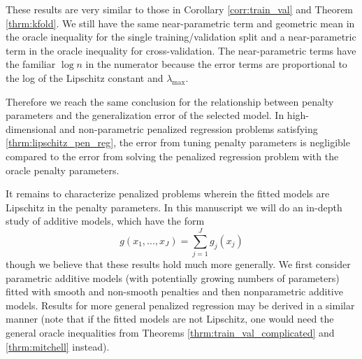 \documentclass[12pt]{article}
\begin{document}
These results are very similar to those in Corollary \ref{corr:train_val} and Theorem \ref{thrm:kfold}. We still have the same near-parametric term and geometric mean in the oracle inequality for the single training/validation split and a near-parametric term in the oracle inequality for cross-validation. The near-parametric terms have the familiar $\log n$ in the numerator because the error terms are proportional to the log of the Lipschitz constant and $\lambda_{\max}$. 

Therefore we reach the same conclusion for the relationship between penalty parameters and the generalization error of the selected model. In high-dimensional and non-parametric penalized regression problems satisfying \eqref{thrm:lipschitz_pen_reg}, the error from tuning penalty parameters is negligible compared to the error from solving the penalized regression problem with the oracle penalty parameters.

It remains to characterize penalized problems wherein the fitted models are Lipschitz in the penalty parameters. In this manuscript we will do an in-depth study of additive models, which have the form
\begin{equation}
g(x_1, ..., x_J)= \sum_{j=1}^J g_j(x_j)
\end{equation}
though we believe that these results hold much more generally. We first consider parametric additive models (with potentially growing numbers of parameters) fitted with smooth and non-smooth penalties and then nonparametric additive models. Results for more general penalized regression may be derived in a similar manner (note that if the fitted models are not Lipschitz, one would need the general oracle inequalities from Theorems \ref{thrm:train_val_complicated} and \ref{thrm:mitchell} instead).
\end{document}
